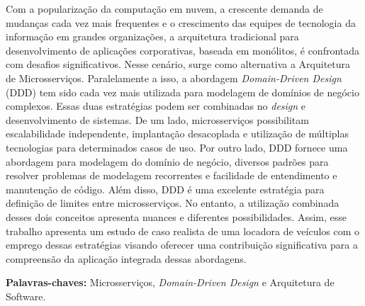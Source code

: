\begin{resumo}



Com a popularização da computação em nuvem, a crescente demanda de mudanças cada vez mais frequentes e o crescimento das equipes de tecnologia da informação em grandes organizações, a arquitetura tradicional para desenvolvimento de aplicações corporativas, baseada em monólitos, é confrontada com desafios significativos. Nesse cenário, surge como alternativa a Arquitetura de Microsserviços. Paralelamente a isso, a abordagem \textit{Domain-Driven Design} (DDD) tem sido cada vez mais utilizada para modelagem de domínios de negócio complexos. Essas duas estratégias podem ser combinadas no \textit{design} e desenvolvimento de sistemas. De um lado, microsserviços possibilitam escalabilidade independente, implantação desacoplada e utilização de múltiplas tecnologias para determinados casos de uso. Por outro lado, DDD fornece uma abordagem para modelagem do domínio de negócio, diversos padrões para resolver problemas de modelagem recorrentes e facilidade de entendimento e manutenção de código. Além disso, DDD é uma excelente estratégia para definição de limites entre microsserviços. No entanto, a utilização combinada desses dois conceitos apresenta nuances e diferentes possibilidades. Assim, esse trabalho apresenta um estudo de caso realista de uma locadora de veículos com o emprego dessas estratégias visando oferecer uma contribuição significativa para a compreensão da aplicação integrada dessas abordagens.

\textbf{Palavras-chaves: } Microsserviços, \textit{Domain-Driven Design} e Arquitetura de Software.  

\end{resumo}



